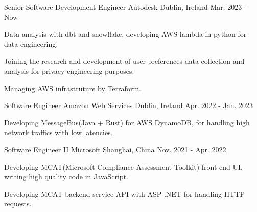 

\begin{cventries}

\cventry
    {Senior Software Development Engineer} %
    {Autodesk} %
    {Dublin, Ireland} %
    {Mar. 2023 - Now} %
    {
      \begin{cvitems} %
        \item {Data analysis with dbt and snowflake, developing AWS lambda in python for data engineering.}
        \item {Joining the research and development of user preferences data collection and analysis for privacy engineering purposes.}
        \item {Managing AWS infrastruture by Terraform.}
      \end{cvitems}
    }

\cventry
    {Software Engineer} %
    {Amazon Web Services} %
    {Dublin, Ireland} %
    {Apr. 2022 - Jan. 2023} %
    {
      \begin{cvitems} %
        \item {Developing MessageBus(Java + Rust) for AWS DynamoDB, for handling high network traffics with low latencies.}
      \end{cvitems}
    }

\cventry
    {Software Engineer II} %
    {Microsoft} %
    {Shanghai, China} %
    {Nov. 2021 - Apr. 2022} %
    {
      \begin{cvitems} %
        \item {Developing MCAT(Microsoft Compliance Assessment Toolkit) front-end UI, writing high quality code in JavaScript.}
        \item {Developing MCAT backend service API with ASP .NET for handling HTTP requests.}
      \end{cvitems}
    }



\end{cventries}
